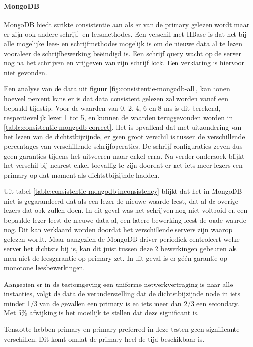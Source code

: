 \paragraph{MongoDB} MongoDB biedt strikte consistentie aan als er van de primary gelezen wordt maar er zijn ook andere schrijf- en leesmethodes. Een verschil met HBase is dat het bij alle mogelijke lees- en schrijfmethodes mogelijk is om de nieuwe data al te lezen vooraleer de schrijfbewerking beëindigd is. Een schrijf query wacht op de server nog na het schrijven en vrijgeven van zijn schrijf lock. Een verklaring is hiervoor niet gevonden.

Een analyse van de data uit figuur \ref{fig:consistentie-mongodb-all}, kan tonen hoeveel percent kans er is dat data consistent gelezen zal worden vanaf een bepaald tijdstip.  Voor de waarden van 0, 2, 4, 6 en 8 ms is dit berekend, respectievelijk lezer 1 tot 5,  en kunnen de waarden teruggevonden worden in \ref{table:consistentie-mongodb-correct}. Het is opvallend dat met uitzondering van het lezen van de dichtstbijzijnde, er geen groot verschil is tussen de verschillende percentages van verschillende schrijfoperaties. De schrijf configuraties geven dus geen garanties tijdens het uitvoeren maar enkel erna.  Na verder onderzoek blijkt het verschil bij nearest enkel toevallig te zijn doordat er net iets meer lezers een primary op dat moment als dichtstbijzijnde hadden. 

Uit tabel \ref{table:consistentie-mongodb-inconsistency} blijkt dat het in MongoDB niet is gegarandeerd dat als een lezer de nieuwe waarde leest, dat al de overige lezers dat ook zullen doen. In dit geval was het schrijven nog niet voltooid en een bepaalde lezer leest de nieuwe data al, een latere bewerking leest de oude waarde nog. Dit kan verklaard worden doordat het verschillende servers zijn waarop gelezen wordt. Maar aangezien de MongoDB driver periodiek controleert welke server het dichtste bij is, kan dit juist tussen deze 2 bewerkingen gebeuren als men niet de leesgarantie op primary zet. In dit geval is er géén garantie op monotone leesbewerkingen. 

Aangezien er in de testomgeving een uniforme netwerkvertraging is naar alle instanties, volgt de data de veronderstelling dat de dichtstbijzijnde node in iets minder 1/3 van de gevallen een primary is en iets meer dan 2/3 een secondary. Met 5\% afwijking is het moeilijk te stellen dat deze significant is. 

Tenslotte hebben primary en primary-preferred in deze testen geen significante verschillen. Dit komt omdat de primary heel de tijd beschikbaar is. 

